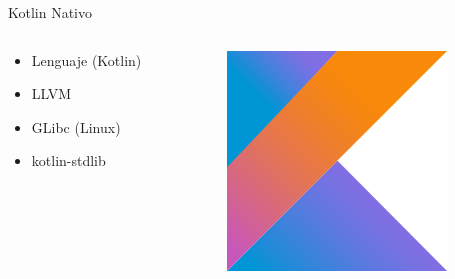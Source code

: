 \documentclass[aspectratio=169]{beamer}
\begin{document}
\begin{frame}[fragile]{Kotlin Nativo}
    \begin{columns}
        \begin{column}{0.5\textwidth}
            \begin{itemize}
                \item Lenguaje (Kotlin)
                \item LLVM
                \item GLibc (Linux)
                \item kotlin-stdlib
            \end{itemize}
        \end{column}
        \begin{column}{0.5\textwidth}  %
            \begin{figure}
                \centering
                \includegraphics[width=0.4\linewidth]{Images/kotlin}
            \end{figure}
        \end{column}
    \end{columns}

\end{frame}
\end{document}
